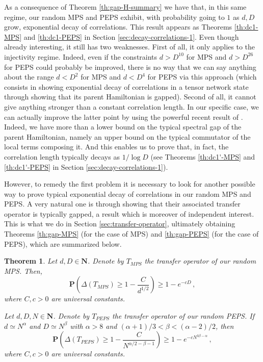 \documentclass{amsart}
\newtheorem{theorem}{Theorem}[section]
\newcommand{\N}{\mathbf{N}}
\renewcommand{\P}{\mathbf{P}}
\renewcommand{\geq}{\geqslant}
\begin{document}
As a consequence of Theorem \ref{th:gap-H-summary} we have that, in this same regime, our random MPS and PEPS exhibit, with probability going to $1$ as $d,D$ grow, exponential decay of correlations. This result appears as Theorems \ref{th:dc1-MPS} and \ref{th:dc1-PEPS} in Section \ref{sec:decay-correlations-1}. Even though already interesting, it still has two weaknesses. First of all, it only applies to the injectivity regime. Indeed, even if the constraints $d>D^{10}$ for MPS and $d>D^{26}$ for PEPS could probably be improved, there is no way that we can say anything about the range $d<D^2$ for MPS and $d<D^4$ for PEPS via this approach (which consists in showing exponential decay of correlations in a tensor network state through showing that its parent Hamiltonian is gapped). Second of all, it cannot give anything stronger than a constant correlation length. In our specific case, we can actually improve the latter point by using the powerful recent result of \cite{HHKL}. Indeed, we have more than a lower bound on the typical spectral gap of the parent Hamiltonian, namely an upper bound on the typical commutator of the local terms composing it. And this enables us to prove that, in fact, the correlation length typically decays as $1/\log D$ (see Theorems \ref{th:dc1'-MPS} and \ref{th:dc1'-PEPS} in Section \ref{sec:decay-correlations-1}).

However, to remedy the first problem it is necessary to look for another possible way to prove typical exponential decay of correlations in our random MPS and PEPS. A very natural one is through showing that their associated transfer operator is typically gapped, a result which is moreover of independent interest. This is what we do in Section \ref{sec:transfer-operator}, ultimately obtaining Theorems \ref{th:gap-MPS} (for the case of MPS) and \ref{th:gap-PEPS} (for the case of PEPS), which are summarized below.

\begin{theorem} \label{th:gap-T-summary}
    Let $d,D\in\N$. Denote by $T_{MPS}$ the transfer operator of our random MPS. Then,
    \[ \P\left( \Delta\left(T_{MPS}\right) \geq 1 - \frac{C}{d^{1/2}} \right) \geq 1-e^{-cD} \, , \]
    where $C,c>0$ are universal constants.

    Let $d,D,N\in\N$. Denote by $T_{PEPS}$ the transfer operator of our random PEPS. If $d\simeq N^{\alpha}$ and $D\simeq N^{\beta}$ with $\alpha>8$ and $(\alpha+1)/3<\beta<(\alpha-2)/2$, then
    \[  \P\left( \Delta\left(T_{PEPS}\right) \geq 1-\frac{C}{N^{\alpha/2-\beta-1}} \right) \geq 1-e^{-cN^{3\beta-\alpha}} \, , \]
    where $C,c>0$ are universal constants.
\end{theorem}
\end{document}
